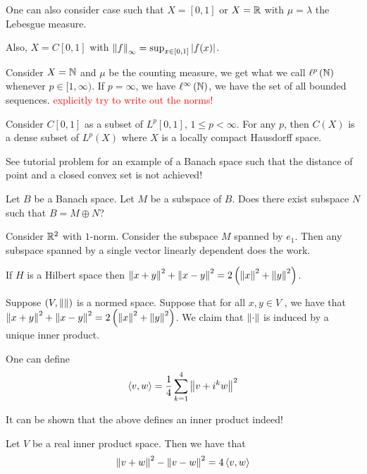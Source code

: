     One can also consider case such that $X=[0,1]$ or $X= \mathbb R$ with $\mu=\lambda$ the Lebesgue measure.

    Also, $X=C[0,1]$ with $\left\lVert f \right\rVert_{\infty} = \sup_{x\in [0,1]} \left\lvert f(x) \right\rvert$.

    Consider $X=\mathbb N$ and $\mu$ be the counting measure, we get what we call $\ell ^{p} \left( \mathbb N \right)$ whenever $p\in [1,\infty)$. If $p=\infty$, we have $\ell ^{\infty} \left( \mathbb N \right)$, we have the set of all bounded sequences. \textcolor{red}{explicitly try to write out the norms!}
    

    Consider $C[0,1]$ as a subset of $L^{p} [0,1]$, $1 \le p < \infty$. For any $p$, then $C(X)$ is a dense subset of $L^{p} (X)$ where $X$ is a locally compact Hausdorff space.


    \horz

    See tutorial problem for an example of a Banach space such that the distance of point and a closed convex set is not achieved!

    Let $B$ be a Banach space. Let $M$ be a subspace of $B$. Does there exist subspace $N$ such that $B=M\oplus N$?

    Consider $\mathbb R ^{2}$ with $1$-norm. Consider the subspace $M$ spanned by $e_{1}$. Then any subspace spanned by a single vector linearly dependent does the work.
    \horz

    If $H$ is a Hilbert space then $\left\lVert x+y \right\rVert ^{2} + \left\lVert x-y \right\rVert^{2} = 2\left( \left\lVert x \right\rVert^{2} + \left\lVert y \right\rVert^{2} \right)$.

    Suppose $\left( V, \left\lVert  \right\rVert \right)$ is a normed space. Suppose that for all $x,y \in V$ , we have that  $\left\lVert x+y \right\rVert ^{2} + \left\lVert x-y \right\rVert^{2} = 2\left( \left\lVert x \right\rVert^{2} + \left\lVert y \right\rVert^{2} \right)$. We claim that $\left\lVert \cdot  \right\rVert$ is induced by a unique inner product.

    One can define 
    \begin{align*}
	\left\langle v,w \right\rangle = \frac{1}{4} \sum_{k=1}^{4} \left\lVert v+i^{k} w  \right\rVert ^{2}
    \end{align*}

    It can be shown that the above defines an inner product indeed!

    \horz

    Let $V$ be a real inner product space. Then we have that 
    \begin{align*}
	\left\lVert v+w \right\rVert^{2} - \left\lVert v-w \right\rVert ^{2} = 4 \left\langle v,w \right\rangle
    \end{align*}

